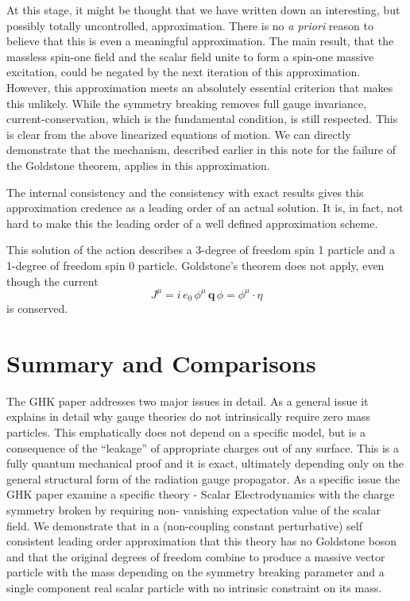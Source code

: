 \documentclass[letterpaper,twoside,preprintnumbers,slac_one]{revtex4}
\begin{document}
At this stage, it might be thought that we have written down an
interesting, but possibly totally uncontrolled, approximation. There
is no \emph{a priori} reason to believe that this is even a meaningful
approximation. The main result, that the massless spin-one field and
the scalar field unite to form a spin-one massive excitation, could be
negated by the next iteration of this approximation. However, this
approximation meets an absolutely essential criterion that makes this
unlikely. While the symmetry breaking removes full gauge invariance,
current-conservation, which is the fundamental condition, is still
respected. This is clear from the above linearized equations of
motion. We can directly demonstrate that the mechanism, described
earlier in this note for the failure of the Goldstone theorem, applies
in this approximation.

The internal consistency and the consistency with exact results gives
this approximation credence as a leading order of an actual
solution. It is, in fact, not hard to make this the leading order of a
well defined approximation scheme.

This solution of the action describes a 3-degree of freedom
spin 1 particle and a 1-degree of freedom spin 0 particle.
Goldstone's theorem does not apply, even though the current
\begin{equation*}
  J^{\mu} = i\, e_0\, \phi^{\mu}\, \mathbf{q}\, \phi = \phi^{\mu}\cdot \eta
\end{equation*}
is conserved.


\section{Summary and Comparisons}

The GHK paper addresses two major issues in detail.  As a general
issue it explains in detail why gauge theories do not
intrinsically require zero mass particles. This emphatically does not
depend on a specific model, but is a consequence of the ``leakage'' of
appropriate charges out of any surface. This is a fully quantum
mechanical proof and it is exact, ultimately depending only on the
general structural form of the radiation gauge propagator.  As a
specific issue the GHK paper examine a specific theory - Scalar
Electrodynamics with the charge symmetry broken by requiring non-
vanishing expectation value of the scalar field. We demonstrate that
in a (non-coupling constant perturbative) self consistent leading
order approximation that this theory has no Goldstone boson and that
the original degrees of freedom combine to produce a massive vector
particle with the mass depending on the symmetry breaking parameter
and a single component real scalar particle with no intrinsic
constraint on its mass.
\end{document}
